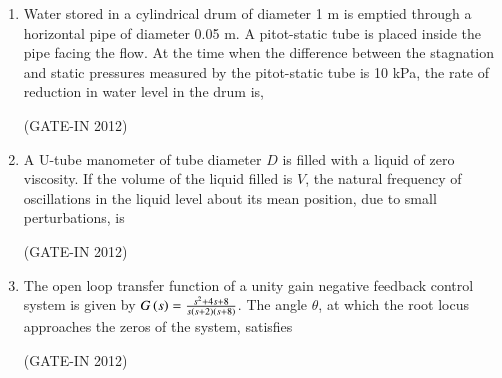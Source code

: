 \documentclass[journal,12pt,onecolumn]{IEEEtran}
\theoremstyle{remark}
\begin{document}
\begin{enumerate}
\item Water  stored in a cylindrical drum of diameter 1 m is emptied through a horizontal pipe of diameter 0.05 m. A pitot-static tube is placed inside the pipe facing the flow. At the time when the difference between the stagnation and static pressures measured by the pitot-static tube is 10 kPa, the rate of reduction in water level in the drum is,

\hfill{(GATE-IN 2012)}
\begin{enumerate}
\end{enumerate}

\item A U-tube manometer of tube diameter $D$ is filled with a liquid of zero viscosity. If the volume of the liquid filled is $V$, the natural frequency of oscillations in the liquid level about its mean position, due to small perturbations, is

\hfill{(GATE-IN 2012)}
\begin{enumerate}
\end{enumerate}

\item The open loop transfer function of a unity gain negative feedback control system is given by $G\left(s\right) = \frac{s^2+4s+8}{s\left(s+2\right)\left(s+8\right)}$. The angle $\theta$, at which the root locus approaches the zeros of the system, satisfies

\hfill{(GATE-IN 2012)}
\begin{enumerate}
\end{enumerate}


\end{enumerate}
\end{document}
